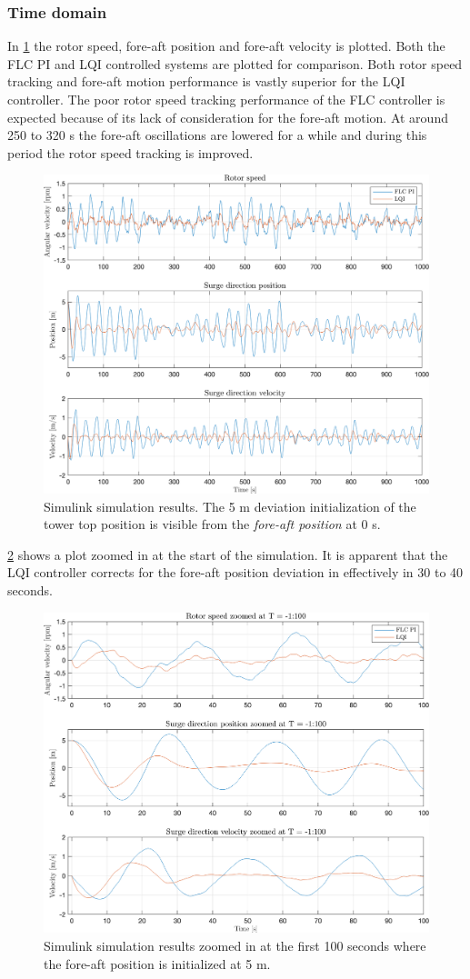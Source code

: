 \clearpage
\subsubsection{Time domain}
In \cref{fig:sim_11_W_py_vy_comp} the rotor speed, fore-aft position and fore-aft velocity is plotted. Both the FLC PI and LQI controlled systems are plotted for comparison. Both rotor speed tracking and fore-aft motion performance is vastly superior for the LQI controller. The poor rotor speed tracking performance of the FLC controller is expected because of its lack of consideration for the fore-aft motion. At around 250 to 320 s the fore-aft oscillations are lowered for a while and during this period the rotor speed tracking is improved.
\begin{figure}[ht]
	\centering
	\includegraphics[width=0.7\linewidth]{Graphics/TestResults/linearModPerf/sim_11_W_py_vy_comp.png}
	\caption{Simulink simulation results. The 5 m deviation initialization of the tower top position is visible from the \textit{fore-aft position} at 0 s.}
	\label{fig:sim_11_W_py_vy_comp}
\end{figure}
\cref{fig:sim_12_W_py_vy_comp_zoom} shows a plot zoomed in at the start of the simulation. It is apparent that the LQI controller corrects for the fore-aft position deviation in effectively in 30 to 40 seconds.
\begin{figure}[ht]
	\centering
	\includegraphics[width=0.7\linewidth]{Graphics/TestResults/linearModPerf/sim_12_W_py_vy_comp_zoom.png}
	\caption{Simulink simulation results zoomed in at the first 100 seconds where the fore-aft position is initialized at 5 m.}
	\label{fig:sim_12_W_py_vy_comp_zoom}
\end{figure}
